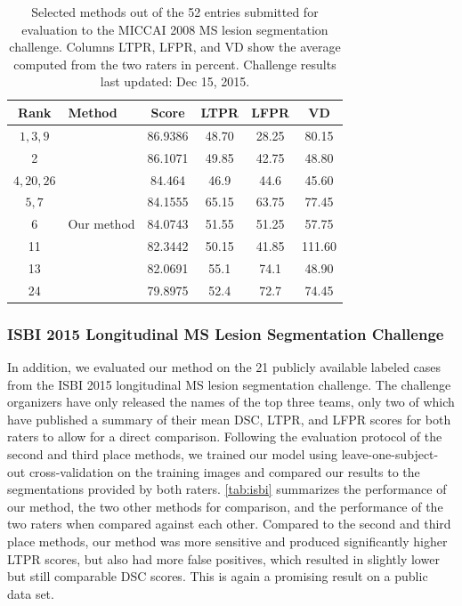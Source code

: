 \begin{table}[tb]
%
\caption[Selected methods out of the 52 entries submitted for evaluation to the
MICCAI 2008 MS lesion segmentation challenge]{Selected methods out of the 52
entries submitted for evaluation to the MICCAI 2008 MS lesion segmentation
challenge. Columns LTPR, LFPR, and VD show the average computed from the two
raters in percent. Challenge results last updated: Dec 15, 2015.}
\label{tab:miccai}
\centering
\begin{tabular}{@{}clS[table-format=2.2]
S[table-format=2.1,round-precision=1]
S[table-format=2.1,round-precision=1]
S[table-format=2.1,round-precision=1]@{}}
\toprule
Rank & Method & {Score} & {LTPR} & {LFPR} & {VD} \\
\midrule
$1,3,9$  & \citet{jesson2015} & 86.9386 & 48.70 & 28.25 & 80.15 \\
2  & \citet{guizard2015}   & 86.1071 & 49.85 & 42.75 & 48.80 \\
$4,20,26$  & \citet{tomas2015} & 84.464 & 46.9 & 44.6 &
45.60 \\
$5,7$ & \citet{jerman2015}        & 84.1555 & 65.15 & 63.75 & 77.45 \\
6  & Our method    & 84.0743 & 51.55 & 51.25 & 57.75 \\
11 & \citet{roura2015} & 82.3442 & 50.15 & 41.85 & 111.60 \\
13 & \citet{geremia2010}     & 82.0691 & 55.1 & 74.1 & 48.90 \\
24 & \citet{shiee2010} & 79.8975 & 52.4 & 72.7 & 74.45 \\
\bottomrule
\end{tabular}
\end{table}

\subsubsection{ISBI 2015 Longitudinal MS Lesion Segmentation Challenge}

In addition, we evaluated our method on the 21 publicly available labeled cases
from the ISBI 2015 longitudinal MS lesion segmentation challenge. The challenge
organizers have only released the names of the top three teams, only two of
which have published a summary of their mean DSC, LTPR, and LFPR scores for both
raters to allow for a direct comparison. Following the evaluation protocol of
the second \citep{jesson2015} and third \citep{maier2015} place methods, we
trained our model using leave-one-subject-out cross-validation on the training
images and compared our results to the segmentations provided by both raters.
\ref{tab:isbi} summarizes the performance of our method, the two other
methods for comparison, and the performance of the two raters when compared
against each other. Compared to the second and third place methods, our method
was more sensitive and produced significantly higher LTPR scores, but also had
more false positives, which resulted in slightly lower but still comparable DSC
scores. This is again a promising result on a public data set.

